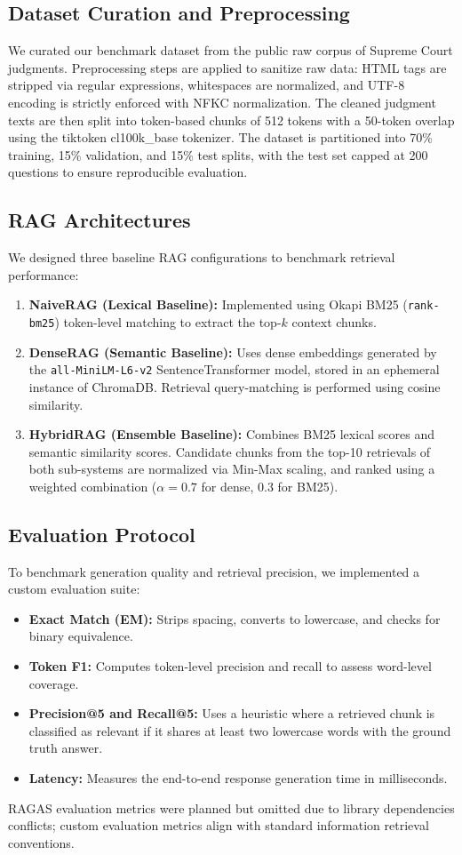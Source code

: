 \documentclass[11pt]{article}
\begin{document}
\subsection{Dataset Curation and Preprocessing}
We curated our benchmark dataset from the public raw corpus of Supreme Court judgments. Preprocessing steps are applied to sanitize raw data: HTML tags are stripped via regular expressions, whitespaces are normalized, and UTF-8 encoding is strictly enforced with NFKC normalization. The cleaned judgment texts are then split into token-based chunks of 512 tokens with a 50-token overlap using the tiktoken cl100k\_base tokenizer. The dataset is partitioned into 70\% training, 15\% validation, and 15\% test splits, with the test set capped at 200 questions to ensure reproducible evaluation.

\subsection{RAG Architectures}
We designed three baseline RAG configurations to benchmark retrieval performance:
\begin{enumerate}
    \item \textbf{NaiveRAG (Lexical Baseline):} Implemented using Okapi BM25 (\texttt{rank-bm25}) token-level matching to extract the top-$k$ context chunks.
    \item \textbf{DenseRAG (Semantic Baseline):} Uses dense embeddings generated by the \texttt{all-MiniLM-L6-v2} SentenceTransformer model, stored in an ephemeral instance of ChromaDB. Retrieval query-matching is performed using cosine similarity.
    \item \textbf{HybridRAG (Ensemble Baseline):} Combines BM25 lexical scores and semantic similarity scores. Candidate chunks from the top-10 retrievals of both sub-systems are normalized via Min-Max scaling, and ranked using a weighted combination ($\alpha=0.7$ for dense, $0.3$ for BM25).
\end{enumerate}

\subsection{Evaluation Protocol}
To benchmark generation quality and retrieval precision, we implemented a custom evaluation suite:
\begin{itemize}
    \item \textbf{Exact Match (EM):} Strips spacing, converts to lowercase, and checks for binary equivalence.
    \item \textbf{Token F1:} Computes token-level precision and recall to assess word-level coverage.
    \item \textbf{Precision@5 and Recall@5:} Uses a heuristic where a retrieved chunk is classified as relevant if it shares at least two lowercase words with the ground truth answer.
    \item \textbf{Latency:} Measures the end-to-end response generation time in milliseconds.
\end{itemize}
RAGAS evaluation metrics were planned but omitted due to library dependencies conflicts; custom evaluation metrics align with standard information retrieval conventions.
\end{document}
